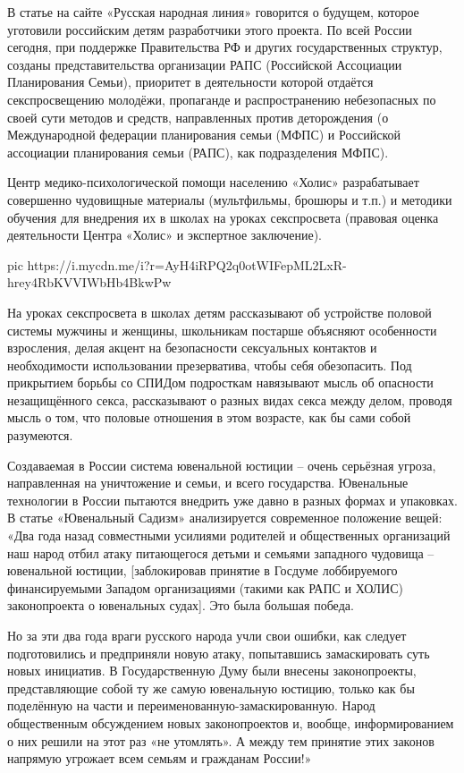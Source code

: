В статье на сайте «Русская народная линия» говорится о будущем, которое
уготовили российским детям разработчики этого проекта. По всей России сегодня,
при поддержке Правительства РФ и других государственных структур, созданы
представительства организации РАПС (Российской Ассоциации Планирования Семьи),
приоритет в деятельности которой отдаётся секспросвещению молодёжи, пропаганде
и распространению небезопасных по своей сути методов и средств, направленных
против деторождения (о Международной федерации планирования семьи (МФПС) и
Российской ассоциации планирования семьи (РАПС), как подразделения МФПС). 

Центр медико-психологической помощи населению «Холис» разрабатывает совершенно
чудовищные материалы (мультфильмы, брошюры и т.п.) и методики обучения для
внедрения их в школах на уроках секспросвета (правовая оценка деятельности
Центра «Холис» и экспертное заключение).

\ifcmt
pic https://i.mycdn.me/i?r=AyH4iRPQ2q0otWIFepML2LxR-hrey4RbKVVIWbHb4BkwPw
\fi

На уроках секспросвета в школах детям рассказывают об устройстве половой
системы мужчины и женщины, школьникам постарше объясняют особенности
взросления, делая акцент на безопасности сексуальных контактов и необходимости
использовании презерватива, чтобы себя обезопасить. Под прикрытием борьбы со
СПИДом подросткам навязывают мысль об опасности незащищённого секса,
рассказывают о разных видах секса между делом, проводя мысль о том, что половые
отношения в этом возрасте, как бы сами собой разумеются. 

Создаваемая в России система ювенальной юстиции – очень серьёзная угроза,
направленная на уничтожение и семьи, и всего государства. Ювенальные технологии
в России пытаются внедрить уже давно в разных формах и упаковках. В статье
«Ювенальный Садизм» анализируется современное положение вещей: «Два года назад
совместными усилиями родителей и общественных организаций наш народ отбил атаку
питающегося детьми и семьями западного чудовища – ювенальной юстиции,
[заблокировав принятие в Госдуме лоббируемого финансируемыми Западом
организациями (такими как РАПС и ХОЛИС) законопроекта о ювенальных судах]. Это
была большая победа. 

Но за эти два года враги русского народа учли свои ошибки, как следует
подготовились и предприняли новую атаку, попытавшись замаскировать суть новых
инициатив. В Государственную Думу были внесены законопроекты, представляющие
собой ту же самую ювенальную юстицию, только как бы поделённую на части и
переименованную-замаскированную. Народ общественным обсуждением новых
законопроектов и, вообще, информированием о них решили на этот раз «не
утомлять». А между тем принятие этих законов напрямую угрожает всем семьям и
гражданам России!»

